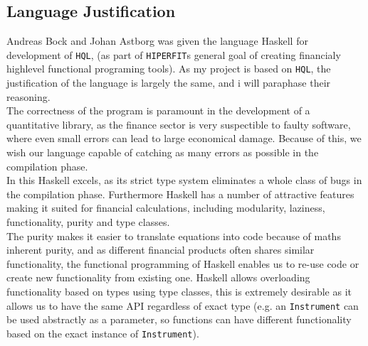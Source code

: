 \documentclass{article}
\newcommand{\HF}{\texttt{HIPERFIT}}
\newcommand{\HQL}{\texttt{HQL}}
\begin{document}
\subsection{Language Justification}
Andreas Bock and Johan Astborg was given the language Haskell for development of \HQL\cite{HQL},
(as part of \HF s general goal of creating financialy highlevel functional programing tools\cite{HF}). 
As my project is based on \HQL, the justification of the language is largely the same, and i will paraphase their reasoning.\\
The correctness of the program is paramount in the development of a quantitative library, as 
the finance sector is very suspectible to faulty software, where even small errors
can lead to large economical damage. Because of this, we wish our language capable
of catching as many errors as possible in the compilation phase. \\
In this Haskell excels, as its strict type system eliminates a whole class of bugs in the
compilation phase. Furthermore Haskell has a number of attractive features making it suited
for financial calculations, including modularity\cite{WFM}, laziness\cite{Cc}, functionality, purity and type classes.\\
The purity makes it easier to translate equations into code because of maths inherent purity,
and as different financial products often shares similar functionality, the functional 
programming of Haskell enables us to re-use code or create new functionality from existing one.
Haskell allows overloading functionality based on types using type classes, this is extremely desirable
as it allows us to have the same API regardless of exact type (e.g. an \texttt{Instrument} can be used abstractly 
as a parameter, so functions can have different functionality based on the exact instance of \texttt{Instrument}).
\end{document}
